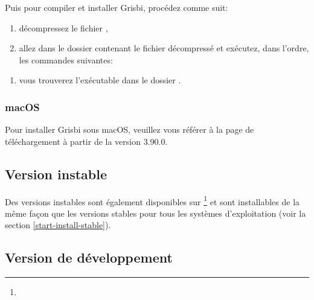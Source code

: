 Puis pour compiler et installer Grisbi, procédez comme suit:

\begin{enumerate}
	\item décompressez le fichier ,
	\item allez dans le dossier contenant le fichier décompressé et exécutez, dans l'ordre, les commandes suivantes:
\end{enumerate}

\setlength{\parindent}{20pt}
	\par
	\par
	\vspace{1mm}

\begin{enumerate}[resume]
	\item vous trouverez l'exécutable dans le dossier .
\end{enumerate}


\subsubsection{macOS\label{start-install-stable-macos}}

Pour installer Grisbi sous macOS, veuillez vous référer à la page de téléchargement à partir de la version 3.90.0.%


\subsection{Version instable\label{start-install-instable}}

Des versions instables sont également disponibles sur \footnote{\urlSourceForgeGrisbiInstable} et sont installables de la même façon que les versions stables pour tous les systèmes d'exploitation (voir la section \vref{start-install-stable}).



\subsection{Version de développement\label{start-install-devel}}

